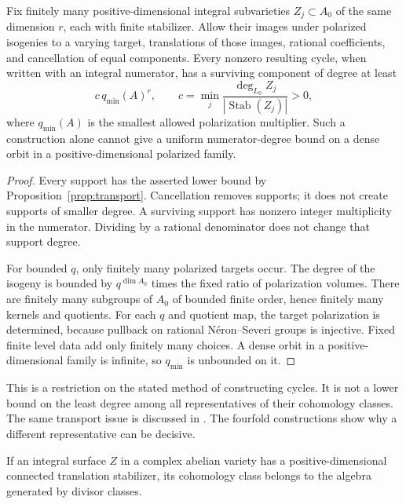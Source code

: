 \begin{corollary}\label{cor:fixed-catalog}
Fix finitely many positive-dimensional integral subvarieties $Z_j\subset A_0$ of the same dimension $r$, each with finite stabilizer. Allow their images under polarized isogenies to a varying target, translations of those images, rational coefficients, and cancellation of equal components. Every nonzero resulting cycle, when written with an integral numerator, has a surviving component of degree at least
\[
 c\,q_{\min}(A)^r,\qquad
 c=\min_j\frac{\deg_{L_0}Z_j}{|\operatorname{Stab}(Z_j)|}>0,
\]
where $q_{\min}(A)$ is the smallest allowed polarization multiplier. Such a construction alone cannot give a uniform numerator-degree bound on a dense orbit in a positive-dimensional polarized family.
\end{corollary}

\begin{proof}
Every support has the asserted lower bound by Proposition~\ref{prop:transport}. Cancellation removes supports; it does not create supports of smaller degree. A surviving support has nonzero integer multiplicity in the numerator. Dividing by a rational denominator does not change that support degree.

For bounded $q$, only finitely many polarized targets occur. The degree of the isogeny is bounded by $q^{\dim A_0}$ times the fixed ratio of polarization volumes. There are finitely many subgroups of $A_0$ of bounded finite order, hence finitely many kernels and quotients. For each $q$ and quotient map, the target polarization is determined, because pullback on rational N\'eron--Severi groups is injective. Fixed finite level data add only finitely many choices. A dense orbit in a positive-dimensional family is infinite, so $q_{\min}$ is unbounded on it.
\end{proof}

This is a restriction on the stated method of constructing cycles. It is not a lower bound on the least degree among all representatives of their cohomology classes. The same transport issue is discussed in \cite{BBAlgebraic}. The fourfold constructions show why a different representative can be decisive.

\begin{lemma}\label{lem:surface-stabilizer}
If an integral surface $Z$ in a complex abelian variety has a positive-dimensional connected translation stabilizer, its cohomology class belongs to the algebra generated by divisor classes.
\end{lemma}

